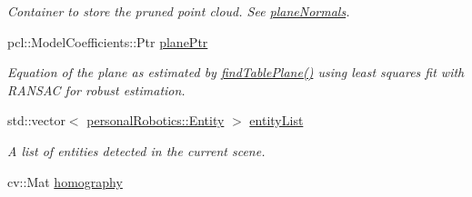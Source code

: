 \begin{DoxyCompactItemize}
\begin{DoxyCompactList}\small\item\em Container to store the pruned point cloud. See \hyperlink{classpersonal_robotics_1_1_object_segmentor_a2d9b43c69441221cd4b03b61da1ba1ae}{plane\+Normals}. \end{DoxyCompactList}\item 
\hypertarget{classpersonal_robotics_1_1_object_segmentor_a90ab411e0e2126ae467fe46b3e2a3cf8}{}pcl\+::\+Model\+Coefficients\+::\+Ptr \hyperlink{classpersonal_robotics_1_1_object_segmentor_a90ab411e0e2126ae467fe46b3e2a3cf8}{plane\+Ptr}\label{classpersonal_robotics_1_1_object_segmentor_a90ab411e0e2126ae467fe46b3e2a3cf8}

\begin{DoxyCompactList}\small\item\em Equation of the plane as estimated by \hyperlink{classpersonal_robotics_1_1_object_segmentor_af4398a1e3f406755ab96787b7d9c50ca}{find\+Table\+Plane()} using least squares fit with R\+A\+N\+S\+A\+C for robust estimation. \end{DoxyCompactList}\item 
\hypertarget{classpersonal_robotics_1_1_object_segmentor_aab2136d73a02806e2b09611ed67e65d9}{}std\+::vector$<$ \hyperlink{classpersonal_robotics_1_1_entity}{personal\+Robotics\+::\+Entity} $>$ \hyperlink{classpersonal_robotics_1_1_object_segmentor_aab2136d73a02806e2b09611ed67e65d9}{entity\+List}\label{classpersonal_robotics_1_1_object_segmentor_aab2136d73a02806e2b09611ed67e65d9}

\begin{DoxyCompactList}\small\item\em A list of entities detected in the current scene. \end{DoxyCompactList}\item 
\hypertarget{classpersonal_robotics_1_1_object_segmentor_a1c8c4d3bb2abf7caa077d8f45849f416}{}cv\+::\+Mat \hyperlink{classpersonal_robotics_1_1_object_segmentor_a1c8c4d3bb2abf7caa077d8f45849f416}{homography}\label{classpersonal_robotics_1_1_object_segmentor_a1c8c4d3bb2abf7caa077d8f45849f416}


\end{DoxyCompactItemize}
